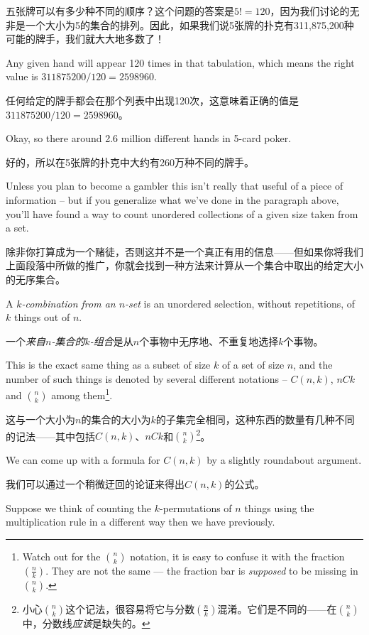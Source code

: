 五张牌可以有多少种不同的顺序？这个问题的答案是$5! = 120$，因为我们讨论的无非是一个大小为5的集合的排列。因此，如果我们说5张牌的扑克有311,875,200种可能的牌手，我们就大大地多数了！

Any
given hand will appear 120 times in that tabulation, which means the 
right value is $311875200/120 = 2598960$.

任何给定的牌手都会在那个列表中出现120次，这意味着正确的值是$311875200/120 = 2598960$。

Okay, so there around 2.6 million
different hands in 5-card poker.

好的，所以在5张牌的扑克中大约有260万种不同的牌手。

Unless you plan to become a gambler
this isn't really that useful of a piece of information -- but if you
generalize what we've done in the paragraph above, you'll have found
a way to count unordered collections of a given size taken from a set.

除非你打算成为一个赌徒，否则这并不是一个真正有用的信息——但如果你将我们上面段落中所做的推广，你就会找到一种方法来计算从一个集合中取出的给定大小的无序集合。

A  \emph{$k$-combination from an $n$-set} is an 
unordered selection, without repetitions, of $k$ things out of $n$.

一个\emph{来自$n$-集合的$k$-组合}是从$n$个事物中无序地、不重复地选择$k$个事物。

This is the exact same thing as a subset of size $k$ of a set of size 
$n$, and the number of such things is denoted by several different 
notations -- $C(n,k)$, $nCk$ and $\displaystyle\binom{n}{k}$ among 
them\footnote{Watch out for the $\binom{n}{k}$ notation, it is easy 
to confuse it with the fraction $\left(\frac{n}{k}\right)$. They
are not the same --- the fraction bar is \emph{supposed} to be missing
in $\binom{n}{k}$.}.

这与一个大小为$n$的集合的大小为$k$的子集完全相同，这种东西的数量有几种不同的记法——其中包括$C(n,k)$、$nCk$和$\displaystyle\binom{n}{k}$\footnote{小心$\binom{n}{k}$这个记法，很容易将它与分数$\left(\frac{n}{k}\right)$混淆。它们是不同的——在$\binom{n}{k}$中，分数线\emph{应该}是缺失的。}。

We can come
up with a formula for $C(n,k)$ by a slightly roundabout argument.

我们可以通过一个稍微迂回的论证来得出$C(n,k)$的公式。

Suppose we think of counting the $k$-permutations of $n$ things using the
multiplication rule in a different way then we have previously.

